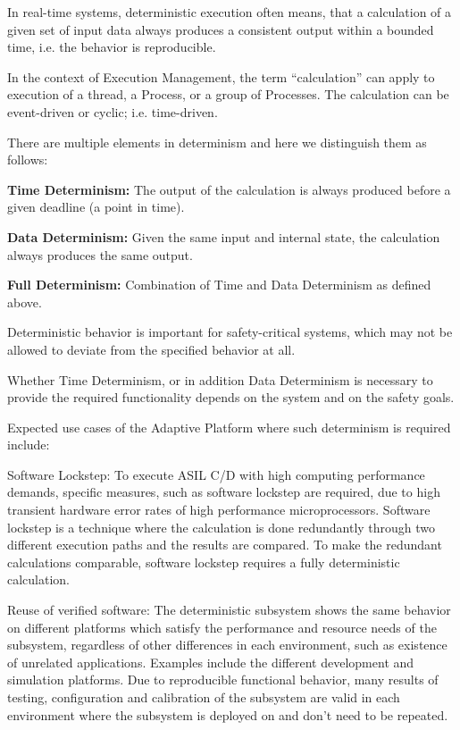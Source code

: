 \begin{DoxyItemize}
\item In real-\/time systems, deterministic execution often means, that a calculation of a given set of input data always produces a consistent output within a bounded time, i.\+e. the behavior is reproducible.
\item In the context of Execution Management, the term “calculation” can apply to execution of a thread, a Process, or a group of Processes. The calculation can be event-\/driven or cyclic; i.\+e. time-\/driven.
\item There are multiple elements in determinism and here we distinguish them as follows\+:
\begin{DoxyItemize}
\item {\bfseries Time Determinism\+:} The output of the calculation is always produced before a given deadline (a point in time).
\item {\bfseries Data Determinism\+:} Given the same input and internal state, the calculation always produces the same output.
\item {\bfseries Full Determinism\+:} Combination of Time and Data Determinism as defined above.
\end{DoxyItemize}
\item Deterministic behavior is important for safety-\/critical systems, which may not be allowed to deviate from the specified behavior at all.
\item Whether Time Determinism, or in addition Data Determinism is necessary to provide the required functionality depends on the system and on the safety goals.
\item Expected use cases of the Adaptive Platform where such determinism is required include\+:
\begin{DoxyItemize}
\item Software Lockstep\+: To execute A\+S\+IL C/D with high computing performance demands, specific measures, such as software lockstep are required, due to high transient hardware error rates of high performance microprocessors. Software lockstep is a technique where the calculation is done redundantly through two different execution paths and the results are compared. To make the redundant calculations comparable, software lockstep requires a fully deterministic calculation.
\item Reuse of verified software\+: The deterministic subsystem shows the same behavior on different platforms which satisfy the performance and resource needs of the subsystem, regardless of other differences in each environment, such as existence of unrelated applications. Examples include the different development and simulation platforms. Due to reproducible functional behavior, many results of testing, configuration and calibration of the subsystem are valid in each environment where the subsystem is deployed on and don’t need to be repeated.
\end{DoxyItemize}
\end{DoxyItemize}

